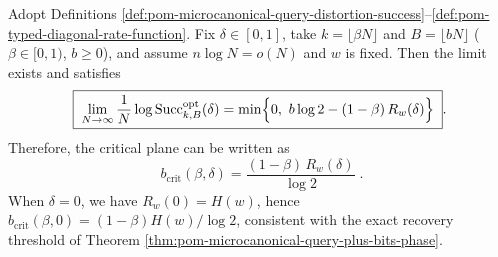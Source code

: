 \begin{theorem}\label{thm:pom-microcanonical-query-distortion-strong-converse-plane}
Adopt Definitions \ref{def:pom-microcanonical-query-distortion-success}--\ref{def:pom-typed-diagonal-rate-function}.
Fix \(\delta\in[0,1]\), take \(k=\lfloor\beta N\rfloor\) and \(B=\lfloor bN\rfloor\) (\(\beta\in[0,1)\), \(b\ge 0\)), and assume \(n\log N=o(N)\) and \(w\) is fixed.
Then the limit exists and satisfies
\[
\boxed{\;
\lim_{N\to\infty}\frac{1}{N}\log \mathrm{Succ}^{\mathrm{opt}}_{k,B}(\delta)
=\min\Bigl\{0,\ b\log 2-(1-\beta)\,R_w(\delta)\Bigr\}\; }.
\]
Therefore, the critical plane can be written as
\[
\boxed{\;
b_{\mathrm{crit}}(\beta,\delta)=\frac{(1-\beta)\,R_w(\delta)}{\log 2}\; } .
\]
When \(\delta=0\), we have \(R_w(0)=H(w)\), hence \(b_{\mathrm{crit}}(\beta,0)=(1-\beta)H(w)/\log 2\), consistent with the exact recovery threshold of Theorem \ref{thm:pom-microcanonical-query-plus-bits-phase}.
\end{theorem}
